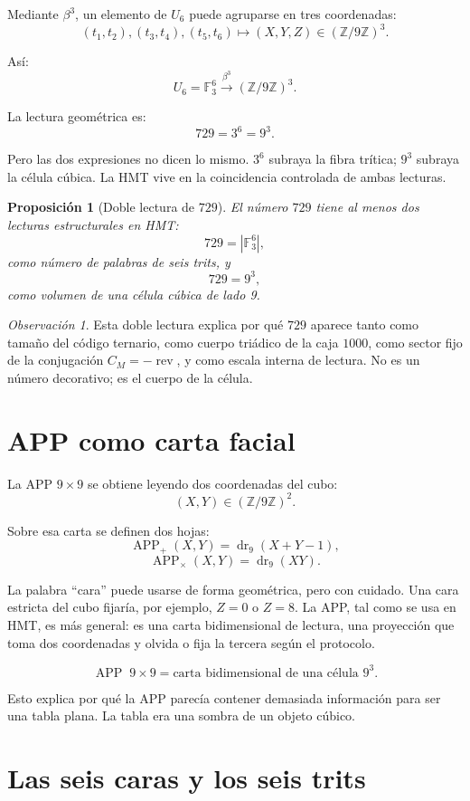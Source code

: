 \documentclass[11pt,a4paper]{article}
\newtheorem{proposicion}[teorema]{Proposición}
\theoremstyle{definition}
\theoremstyle{remark}
\newtheorem{observacion}[teorema]{Observación}
\newcommand{\F}{\mathbb F}
\newcommand{\Z}{\mathbb Z}
\newcommand{\APP}{\operatorname{APP}}
\newcommand{\dr}{\operatorname{dr}_9}
\begin{document}
Mediante \(\beta^3\), un elemento de \(U_6\) puede agruparse en tres coordenadas:
\[
(t_1,t_2),(t_3,t_4),(t_5,t_6)
\longmapsto
(X,Y,Z)\in(\Z/9\Z)^3.
\]

Así:
\[
\boxed{
U_6=\F_3^6\xrightarrow{\beta^3}(\Z/9\Z)^3.
}
\]

La lectura geométrica es:
\[
\boxed{
729=3^6=9^3.
}
\]

Pero las dos expresiones no dicen lo mismo. \(3^6\) subraya la fibra trítica; \(9^3\) subraya la célula cúbica. La HMT vive en la coincidencia controlada de ambas lecturas.

\begin{proposicion}[Doble lectura de \(729\)]
El número \(729\) tiene al menos dos lecturas estructurales en HMT:
\[
729=|\F_3^6|,
\]
como número de palabras de seis trits, y
\[
729=9^3,
\]
como volumen de una célula cúbica de lado 9.
\end{proposicion}

\begin{observacion}
Esta doble lectura explica por qué \(729\) aparece tanto como tamaño del código ternario, como cuerpo triádico de la caja \(1000\), como sector fijo de la conjugación \(C_M=-\operatorname{rev}\), y como escala interna de lectura. No es un número decorativo; es el cuerpo de la célula.
\end{observacion}

\section{APP como carta facial}

La APP \(9\times9\) se obtiene leyendo dos coordenadas del cubo:
\[
(X,Y)\in(\Z/9\Z)^2.
\]

Sobre esa carta se definen dos hojas:
\[
\APP_+(X,Y)=\dr(X+Y-1),
\]
\[
\APP_\times(X,Y)=\dr(XY).
\]

La palabra ``cara'' puede usarse de forma geométrica, pero con cuidado. Una cara estricta del cubo fijaría, por ejemplo, \(Z=0\) o \(Z=8\). La APP, tal como se usa en HMT, es más general: es una carta bidimensional de lectura, una proyección que toma dos coordenadas y olvida o fija la tercera según el protocolo.

\[
\boxed{
\APP\;9\times9=\text{carta bidimensional de una célula }9^3.
}
\]

Esto explica por qué la APP parecía contener demasiada información para ser una tabla plana. La tabla era una sombra de un objeto cúbico.

\section{Las seis caras y los seis trits}
\end{document}

